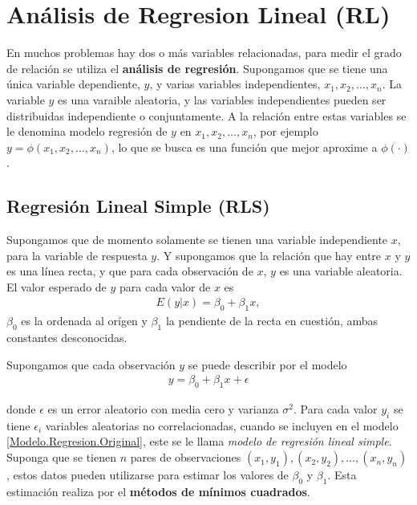 \documentclass[a4paper]{report} %
\begin{document}
\section{An\'alisis de Regresion Lineal (RL)}


En muchos problemas hay dos o m\'as variables relacionadas, para medir el grado de relaci\'on se utiliza el \textbf{an\'alisis de regresi\'on}. Supongamos que se tiene una \'unica variable dependiente, $y$, y varias  variables independientes, $x_{1},x_{2},\ldots,x_{n}$. La variable $y$ es una varaible aleatoria, y las variables independientes pueden ser distribuidas independiente o conjuntamente.  A la relaci\'on entre estas variables se le denomina modelo regresi\'on de $y$ en $x_{1},x_{2},\ldots,x_{n}$, por ejemplo $y=\phi\left(x_{1},x_{2},\ldots,x_{n}\right)$, lo que se busca es una funci\'on que mejor aproxime a $\phi\left(\cdot\right)$.



\subsection{Regresi\'on Lineal Simple (RLS)}

Supongamos que de momento solamente se tienen una variable independiente $x$, para la variable de respuesta $y$. Y supongamos que la relaci\'on que hay entre $x$ y $y$ es una l\'inea recta, y que para cada observaci\'on de $x$, $y$ es una variable aleatoria. El valor esperado de $y$ para cada valor de $x$ es
\begin{eqnarray*}
E\left(y|x\right)=\beta_{0}+\beta_{1}x,
\end{eqnarray*}
$\beta_{0}$ es la ordenada al or\'igen y  $\beta_{1}$ la pendiente de la recta en cuesti\'on, ambas constantes desconocidas. 

Supongamos que cada observaci\'on $y$ se puede describir por el modelo
\begin{eqnarray}\label{Modelo.Regresion.Original}
y=\beta_{0}+\beta_{1}x+\epsilon
\end{eqnarray}

donde $\epsilon$ es un error aleatorio con media cero y varianza $\sigma^{2}$. Para cada valor $y_{i}$ se tiene $\epsilon_{i}$ variables aleatorias no correlacionadas, cuando se incluyen en el modelo \ref{Modelo.Regresion.Original}, este se le llama \textit{modelo de regresi\'on lineal simple}. Suponga que se tienen $n$ pares de observaciones $\left(x_{1},y_{1}\right),\left(x_{2},y_{2}\right),\ldots,\left(x_{n},y_{n}\right)$,  estos datos pueden utilizarse para estimar los valores de $\beta_{0}$ y $\beta_{1}$. Esta estimaci\'on realiza por el \textbf{m\'etodos de m\'inimos cuadrados}.
\end{document}
